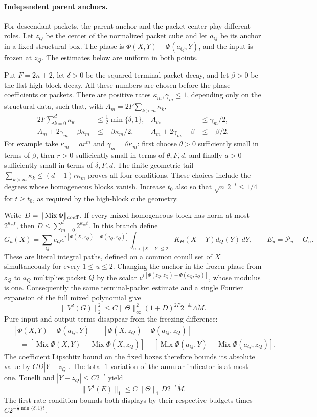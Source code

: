 \documentclass[11pt]{article}
\numberwithin{equation}{section}
\theoremstyle{remark}
\theoremstyle{definition}
\newcommand{\Mix}{\operatorname{Mix}}
\begin{document}
\paragraph{Independent parent anchors.}
For descendant packets, the parent anchor and the packet center play
different roles. Let $z_Q$ be the center of the normalized packet cube
and let $a_Q$ be its anchor in a fixed structural box. The phase is
$\Phi(X,Y)-\Phi(a_Q,Y)$, and the input is frozen at $z_Q$.
The estimates below are uniform in both points.

Put $F=2n+2$, let $\delta>0$ be the squared terminal-packet decay,
and let $\beta>0$ be the flat high-block decay.  All these numbers are
chosen before the phase coefficients or packets.  There are positive
rates $\kappa_m,\gamma_m\le1$, depending only on the structural data,
such that, with $A_m=2F\sum_{k>m}\kappa_k$,
\begin{align*}
 2F\sum_{k=0}^d\kappa_k&\le\tfrac12\min\{\delta,1\},
 & A_m&\le\gamma_m/2,\\
 A_m+2\gamma_m-\beta\kappa_m&\le-\beta\kappa_m/2,
 & A_m+2\gamma_m-\beta&\le-\beta/2.
\end{align*}
For example take $\kappa_m=a r^m$ and $\gamma_m=\theta\kappa_m$:
first choose $\theta>0$ sufficiently small in terms of $\beta$, then
$r>0$ sufficiently small in terms of $\theta,F,d$, and finally $a>0$
sufficiently small in terms of $\delta,F,d$.  The finite geometric tail
$\sum_{k>m}\kappa_k\le(d+1)r\kappa_m$ proves all four conditions.
These choices include the degrees whose homogeneous blocks vanish.
Increase $t_0$ also so that $\sqrt n\,2^{-t}\le1/4$ for $t\ge t_0$,
as required by the high-block cube geometry.

Write $D=\|\Mix\Phi\|_{\rm coeff}$.  If every mixed homogeneous block
has norm at most $2^{\kappa_m t}$, then
$D\le\sum_{m=0}^d2^{\kappa_m t}$.  In this branch define
\[
 G_u(X)=\sum_Q e_Q e^{i[\Phi(X,z_Q)-\Phi(a_Q,z_Q)]}
       \int_{u<|X-Y|\le2}K_\Theta(X-Y)d_Q(Y)\,dY,
 \qquad E_u=\mathcal P_u-G_u.
\]
These are literal integral paths, defined on a common conull set of $X$
simultaneously for every $1\le u\le2$.  Changing the anchor in
the frozen phase from $z_Q$ to $a_Q$ multiplies packet $Q$ by the scalar
$e^{i[\Phi(z_Q,z_Q)-\Phi(a_Q,z_Q)]}$, whose modulus is one.
Consequently the same terminal-packet estimate and a single Fourier
expansion of the full mixed polynomial give
\[
 \|V^2(G)\|_2^2
 \le C\|\Theta\|_\infty^2(1+D)^{2F}2^{-\delta t}\Lambda\widetilde M.
\]
Pure input and output terms disappear from the freezing difference:
\begin{align*}
 &[\Phi(X,Y)-\Phi(a_Q,Y)]-[\Phi(X,z_Q)-\Phi(a_Q,z_Q)]\\
 &\quad=[\Mix\Phi(X,Y)-\Mix\Phi(X,z_Q)]
       -[\Mix\Phi(a_Q,Y)-\Mix\Phi(a_Q,z_Q)].
\end{align*}
The coefficient Lipschitz bound on the fixed boxes therefore bounds its
absolute value by $CD|Y-z_Q|$.  The total $1$-variation of the annular
indicator is at most one.  Tonelli and $|Y-z_Q|\le C2^{-t}$ yield
\[
 \|V^1(E)\|_1\le C\|\Theta\|_1D2^{-t}\widetilde M.
\]
The first rate condition bounds both displays by their respective
budgets times $C2^{-\frac12\min\{\delta,1\}t}$.
\end{document}
